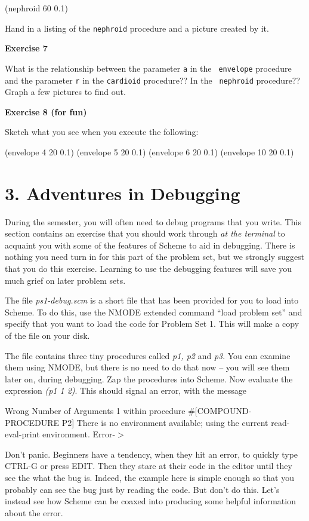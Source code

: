 \beginlisp
	(nephroid 60 0.1)
\endlisp

Hand in a listing of the {\tt nephroid} procedure and a picture created
by it. 

{\bf Exercise 7}

What is the relationship between the parameter {\tt a} in the {\tt
envelope} procedure and
the parameter {\tt r} in the {\tt cardioid} procedure??  In the {\tt
nephroid} procedure?? Graph a few pictures to find out.

{\bf Exercise 8 (for fun)}

Sketch what you see when you execute the following:

\beginlisp
	(envelope 4 20 0.1)
	(envelope 5 20 0.1)
	(envelope 6 20 0.1)
	(envelope 10 20 0.1)
\endlisp


\chapter{3. Adventures in Debugging}

During the semester, you will often need to debug programs that
you write.  This section contains an exercise that you
should work through {\it at the terminal} to acquaint you with some
of the features of Scheme to aid in debugging.  There is
nothing you need turn in for this part of the problem set, but we
strongly suggest that you do this exercise.   Learning to use the
debugging features will save you much grief on later problem
sets.

The file {\it ps1-debug.scm} is a short file that has been provided for
you to load into Scheme.  To do this, use the NMODE extended
command ``load problem set'' and specify that you want to load
the code for Problem Set 1.  This will make a copy of the file on
your disk.

The file contains three tiny procedures called {\it p1, p2} and
{\it p3}.  You can examine them using NMODE, but there is no need to do
that now -- you will see them later on, during debugging. Zap the
procedures into Scheme.  Now evaluate the expression {\it (p1 1 2)}.
This should signal an error, with the message

\beginlisp
Wrong Number of Arguments 1
within procedure \#[COMPOUND-PROCEDURE P2]
There is no environment available;
using the current read-eval-print environment.
 Error-$>$
\endlisp

Don't panic.  Beginners have a tendency, when they hit an error,
to quickly type CTRL-G or press EDIT. Then they stare at
their code in the editor until they see the what the bug is.
Indeed, the example here is simple enough so that you probably
can see the bug just by reading the code.  But don't do
this.  Let's instead see how Scheme can be coaxed into producing
some helpful information about the error.

